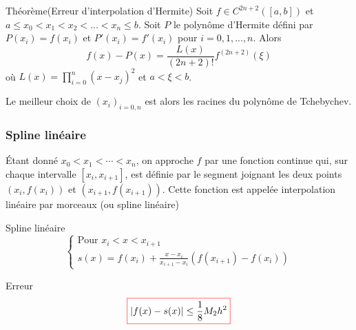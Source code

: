 \documentclass{beamer}
\newcommand{\myredbox}[1]{\fcolorbox{red}{white}{$\displaystyle#1$}}
\begin{document}
\begin{frame}
\begin{block}{Théorème(Erreur d'interpolation d'Hermite)}
Soit $f \in C^{2n+2}([a, b])$ et $a \leq x_0 < x_1 < x_2 < ... < x_n \leq b$. Soit $P$ le polynôme d'Hermite défini par $P(x_i) = f(x_i)$ et $P'(x_i) = f'(x_i)$ pour $i = 0, 1, ..., n$.
Alors
\[f(x) - P(x) =\frac{L(x)}{(2n + 2)!}f^{(2n+2)}(\xi)\]
où $L(x)=\prod_{i=0}^n\left(x-x_j\right)^2$ et $a < \xi < b$.
\end{block}
Le meilleur choix de $\left(x_i\right)_{i=0,n}$ est alors les racines du polynôme de Tchebychev. 
\end{frame}



\begin{frame}
 \frametitle{Spline linéaire}
 Étant donné  $x_0< x_1 <\cdots < x_n$, on approche $f$ par une
fonction continue qui, sur chaque intervalle $[x_i ,x_{i+1}]$, est définie par le segment joignant les deux points $(x_i , f(x_i ))$ et $(x_{i+1}, f(x_{i+1} ))$. Cette fonction est appelée interpolation linéaire par morceaux (ou spline linéaire)
\begin{block}{Spline linéaire}
 \[\left\{\begin{array}{l}
 \mbox{Pour }x_i<x<x_{i+1}\\
s(x)=f(x_i)+\frac{x-x_i}{x_{i+1}-x_{i}}\left(f(x_{i+1})-f(x_{i})\right)
\end{array}\right.
\]
\end{block}
Erreur
\[\myredbox{\left| f(x) - s(x)\right| \leq \frac 18 M_2 h^2}\]
\end{frame}
\end{document}
